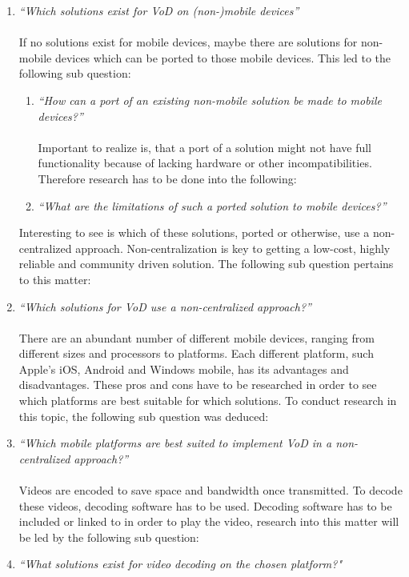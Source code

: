 \begin{enumerate}
	\item\textit{``Which solutions exist for VoD on (non-)mobile devices''}\\
	
	\\If no solutions exist for mobile devices, maybe there are solutions for non-mobile devices which can be ported to those mobile devices. This led to the following sub question:\\

		\begin{enumerate}
			\item\textit{``How can a port of an existing non-mobile solution be made to mobile devices?''}\\
			
			\\Important to realize is, that a port of a solution might not have full functionality because of lacking hardware or other incompatibilities. Therefore research has to be done into the following:\\
			
			\item\textit{``What are the limitations of such a ported solution to mobile devices?''}\\
		\end{enumerate}

	Interesting to see is which of these solutions, ported or otherwise, use a non-centralized approach. Non-centralization is key to getting a low-cost, highly reliable and community driven solution. The following sub question pertains to this matter: \\

	\item\textit{``Which solutions for VoD use a non-centralized approach?''}\\

	\\There are an abundant number of different mobile devices, ranging from different sizes and processors to platforms. Each different platform, such Apple's iOS, Android and Windows mobile, has its advantages and disadvantages. These pros and cons have to be researched in order to see which platforms are best suitable for which solutions. To conduct research in this topic, the following sub question was deduced:\\

	\item\textit{``Which mobile platforms are best suited to implement VoD in a non-centralized approach?''}\\
	
	\\Videos are encoded to save space and bandwidth once transmitted. To decode these videos, decoding software has to be used. Decoding software has to be included or linked to in order to play the video, research into this matter will be led by the following sub question:\\

	\item\textit{``What solutions exist for video decoding on the chosen platform?"}\\
\end{enumerate}

